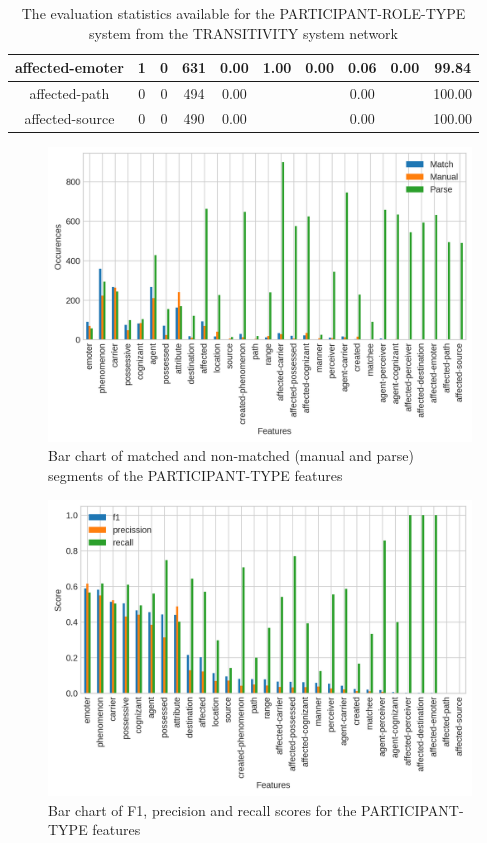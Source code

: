 \begin{table}[!ht]
{\begin{tabular}{|c|c|c|c|c|c|c|c|c|c|}
            affected-emoter & 1 & 0 & 631 & 0.00 & 1.00 & 0.00 & 0.06 & 0.00 & 99.84 \\ \hline
            affected-path & 0 & 0 & 494 & 0.00 &  &  & 0.00 &  & 100.00 \\ \hline
            affected-source & 0 & 0 & 490 & 0.00 &  &  & 0.00 &  & 100.00 \\ \hline
        \end{tabular}
    }
    \caption{The evaluation statistics available for the PARTICIPANT-ROLE-TYPE system from the TRANSITIVITY system network}
    \label{tab:features-participant-role}
    \end{table}

    \begin{figure}[!ht]
        \centering
        \includegraphics[width=.995\textwidth]{evaluation-results/figures/accuracy-semantic-participant-type1}
        \caption{Bar chart of matched and non-matched (manual and parse) segments of the PARTICIPANT-TYPE features}
        \label{fig:participant-roles}
    \end{figure}
    \begin{figure}[!ht]
        \centering
        \includegraphics[width=.995\textwidth]{evaluation-results/figures/accuracy-semantic-participant-type1-f1}
        \caption{Bar chart of F1, precision and recall scores for the PARTICIPANT-TYPE features}
        \label{fig:participant-roles-f1}
    \end{figure}

